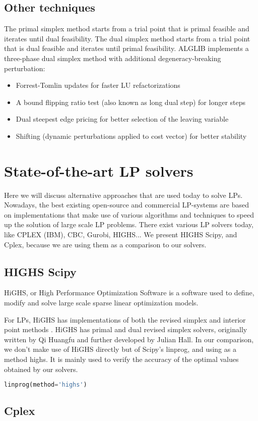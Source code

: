 \subsection{Other techniques}
The primal simplex method starts from a trial point that is primal feasible and iterates until dual feasibility.
The dual simplex method starts from a trial point that is dual feasible and iterates until primal feasibility.
ALGLIB implements a three-phase dual simplex method with additional degeneracy-breaking perturbation:
\begin{itemize}
    \item Forrest-Tomlin updates for faster LU refactorizations
    \item A bound flipping ratio test (also known as long dual step) for longer steps
    \item Dual steepest edge pricing for better selection of the leaving variable
    \item Shifting (dynamic perturbations applied to cost vector) for better stability
\end{itemize}

\section{State-of-the-art LP solvers}
Here we will discuss alternative approaches that are used today to solve LPs. Nowadays, the best
existing open-source and commercial LP-systems are based on implementations that make use
of various algorithms and techniques to speed up the solution of large scale LP problems.
There exist various LP solvers today, like CPLEX (IBM), CBC, Gurobi, HIGHS... We present HIGHS Scipy, and 
Cplex, because we are using them as a comparison to our solvers.
\subsection{HIGHS Scipy}
HiGHS, or High Performance Optimization Software is a software used to define,
modify and solve large scale sparse linear optimization models.

For LPs, HiGHS has implementations of both the revised simplex and interior point methods 
\parencite{Huangfu2018}. 
HiGHS has primal and
 dual revised simplex solvers, originally written by Qi Huangfu and 
 further developed by Julian Hall. 
In our comparison, we don't make use of HiGHS directly but of Scipy's linprog, and using as 
a method highs. It is mainly used to verify the accuracy of the optimal values 
obtained by our solvers.

\begin{lstlisting}[language=Python]
    linprog(method='highs')
\end{lstlisting}

\subsection{Cplex}

